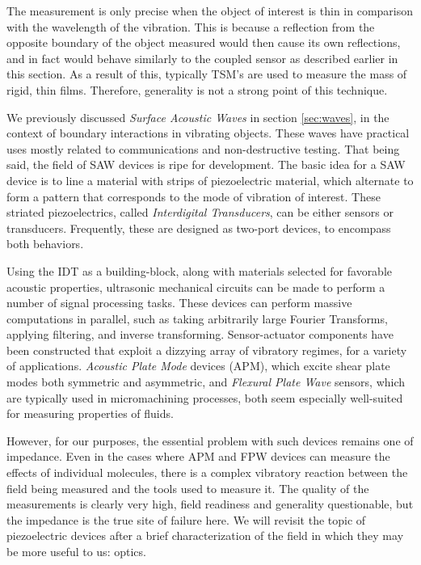 \documentclass[a4paper,10pt]{report}
\numberwithin{equation}{section}
\begin{document}
The measurement is only precise when the object of interest is thin in comparison with the wavelength of the vibration. This is because a reflection from the opposite boundary of the object measured would then cause its own reflections, and in fact would behave similarly to the coupled sensor as described earlier in this section. As a result of this, typically TSM's are used to measure the mass of rigid, thin films. Therefore, generality is not a strong point of this technique. 

We previously discussed \emph{Surface Acoustic Waves} in section \ref{sec:waves}, in the context of boundary interactions in vibrating objects. These waves have practical uses mostly related to communications and non-destructive testing. That being said, the field of SAW devices is ripe for development. The basic idea for a SAW device is to line a material with strips of piezoelectric material, which alternate to form a pattern that corresponds to the mode of vibration of interest. These striated piezoelectrics, called \emph{Interdigital Transducers}, can be either sensors or transducers. Frequently, these are designed as two-port devices, to encompass both behaviors. \cite[p.~36]{Ballantine1997}

Using the IDT as a building-block, along with materials selected for favorable acoustic properties, ultrasonic mechanical circuits can be made to perform a number of signal processing tasks. \cite[p.~318]{Kino1987} These devices can perform massive computations in parallel, such as taking arbitrarily large Fourier Transforms, applying filtering, and inverse transforming. \cite[p.~391]{Kino1987} Sensor-actuator components have been constructed that exploit a dizzying array of vibratory regimes, for a variety of applications. \emph{Acoustic Plate Mode} devices (APM), which excite shear plate modes both symmetric and asymmetric, and \emph{Flexural Plate Wave} sensors, which are typically used in micromachining processes, both seem especially well-suited for measuring properties of fluids.\cite[p.~106]{Ballantine1997}\cite[p.115]{Ballantine1997}

However, for our purposes, the essential problem with such devices remains one of impedance. Even in the cases where APM and FPW devices can measure the effects of individual molecules, there is a complex vibratory reaction between the field being measured and the tools used to measure it. \cite[p.~120]{Ballantine1997} The quality of the measurements is clearly very high, field readiness and generality questionable, but the impedance is the true site of failure here. We will revisit the topic of piezoelectric devices after a brief characterization of the field in which they may be more useful to us: optics.
\end{document}
